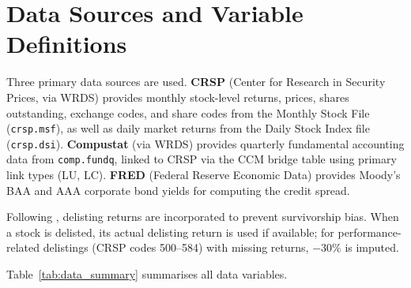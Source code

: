 
\section{Data Sources and Variable Definitions}\label{app:data_summary}

Three primary data sources are used. \textbf{CRSP} (Center for Research in Security Prices, via WRDS) provides monthly stock-level returns, prices, shares outstanding, exchange codes, and share codes from the Monthly Stock File (\texttt{crsp.msf}), as well as daily market returns from the Daily Stock Index file (\texttt{crsp.dsi}). \textbf{Compustat} (via WRDS) provides quarterly fundamental accounting data from \texttt{comp.fundq}, linked to CRSP via the CCM bridge table using primary link types (LU, LC). \textbf{FRED} (Federal Reserve Economic Data) provides Moody's BAA and AAA corporate bond yields for computing the credit spread.

Following \citet{Shumway1997}, delisting returns are incorporated to prevent survivorship bias. When a stock is delisted, its actual delisting return is used if available; for performance-related delistings (CRSP codes 500--584) with missing returns, $-30\%$ is imputed.

Table~\ref{tab:data_summary} summarises all data variables.

